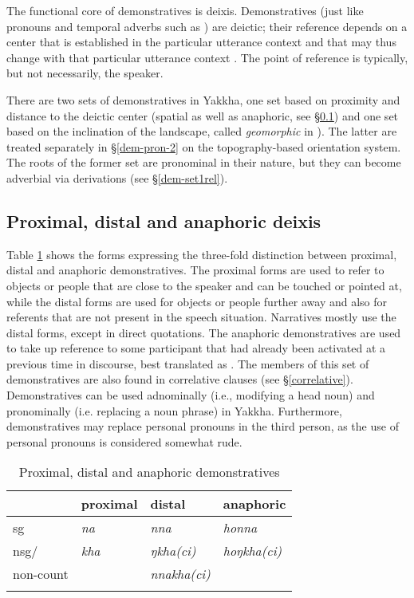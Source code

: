 The functional core of demonstratives is deixis. Demonstratives (just like pronouns and temporal adverbs such as ) are deictic; their reference depends on a center that is established in the  particular utterance context and that may thus  change with that particular utterance context \citep{Buehler1934_Sprachtheorie, Fillmore1997_Deixis}. The point of reference is typically, but not necessarily, the speaker. 


There are two sets of demonstratives in Yakkha, one set based on proximity and distance to the deictic center (spatial as well as anaphoric, see §\ref{dem-pron-1}) and one set based on the inclination of the landscape, called \emph{geomorphic} in \citet{Bickel1997Spatial}). The latter are treated separately in §\ref{dem-pron-2} on the topography-based orientation system. The roots of the former set are pronominal in  their nature, but they can become adverbial via derivations (see §\ref{dem-set1rel}). 


\subsection{Proximal, distal and anaphoric deixis}\label{dem-pron-1}

Table \ref{dem-tab} shows the forms expressing the three-fold distinction between proximal, distal and anaphoric demonstratives. The proximal forms are used to refer to objects or people that are close to the speaker and can be touched or pointed at, while the distal forms are used for objects or people further away and also for referents that are not present in the speech situation. Narratives mostly use the distal forms, except in direct quotations. The anaphoric demonstratives are used to take up  reference to some participant that had  already been activated at a previous time in discourse, best translated as  . The members of this set of demonstratives are also found in correlative clauses (see §\ref{correlative}). Demonstratives can be used adnominally (i.e., modifying a head noun) and pronominally (i.e. replacing a noun phrase) in Yakkha. Furthermore, demonstratives may replace personal pronouns in the third person, as the use of personal pronouns is considered somewhat rude.


\begin{table}[htp]
\begin{centering}
\begin{tabular}{llll}
\lsptoprule
&			{\sc proximal} 	& {\sc distal}	& {\sc anaphoric}  \\
\midrule
{\sc sg}						&	\emph{na}		&	\emph{nna}		& \emph{honna}\\
{\sc nsg/}	&		\emph{kha}	&	\emph{ŋkha(ci)}	\ti	& \emph{hoŋkha(ci)}\\
{\sc non-count}	&			&	\emph{nnakha(ci)}	& \\
\lspbottomrule
\end{tabular}\\
\caption{Proximal, distal and anaphoric demonstratives}\label{dem-tab}
\end{centering}
\end{table}


